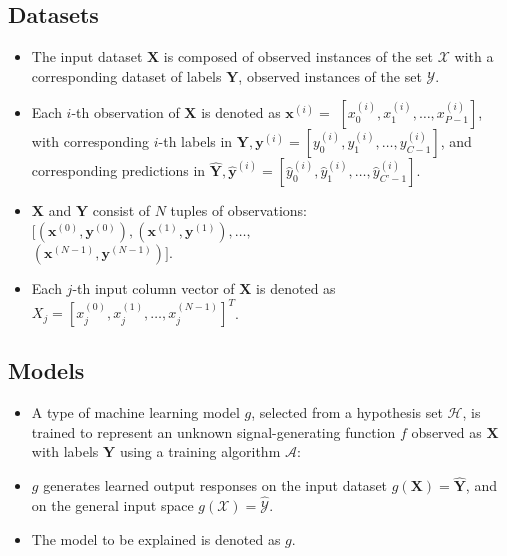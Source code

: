 \documentclass{article}
\begin{document}
	\subsection{Datasets} 

	\begin{itemize}
		\item The input dataset $\mathbf{X}$ is composed of observed instances of the set $\mathcal{X}$ with a corresponding dataset of labels $\mathbf{Y}$, observed instances of the set $\mathcal{Y}$.
		\item Each $i$-th observation of $\mathbf{X}$ is denoted as $\mathbf{x}^{(i)} = $  
		$[x_0^{(i)}, x_1^{(i)}, \dots, x_{\textit{P}-1}^{(i)}]$, with corresponding $i$-th labels in $\mathbf{Y}, \mathbf{y}^{(i)} = [y_0^{(i)}, y_1^{(i)}, \dots, y_{\textit{C}-1}^{(i)}]$, and corresponding predictions in $\mathbf{\hat{Y}}, \mathbf{\hat{y}}^{(i)} =  [\hat{y}_0^{(i)}, \hat{y}_1^{(i)}, \dots, \hat{y}_{\textit{C'}-1}^{(i)}]$. %
		\item $\mathbf{X}$ and $\mathbf{Y}$ consist of $N$ tuples of observations: $[(\mathbf{x}^{(0)},\mathbf{y}^{(0)}), (\mathbf{x}^{(1)},\mathbf{y}^{(1)}), \dots,$\\$(\mathbf{x}^{(N-1)},\mathbf{y}^{(N-1)})]$. %
		\item Each $j$-th input column vector of $\mathbf{X}$ is denoted as $X_j = [x_{j}^{(0)}, x_{j}^{(1)}, \dots, x_{j}^{(N-1)}]^T$.
	\end{itemize}	
	
	\subsection{Models}

	\begin{itemize}
		\item A type of machine learning model $g$, selected from a hypothesis set $\mathcal{H}$, is trained to represent an unknown signal-generating function $f$ observed as  $\mathbf{X}$ with labels $\mathbf{Y}$ using a training algorithm $\mathcal{A}$: 
		\item $g$ generates learned output responses on the input dataset $g(\mathbf{X}) = \mathbf{\hat{Y}}$, and on the general input space $g(\mathcal{X}) = \hat{\mathcal{Y}}$.
		\item The model to be explained is denoted as $g$.
	\end{itemize}
\end{document}

